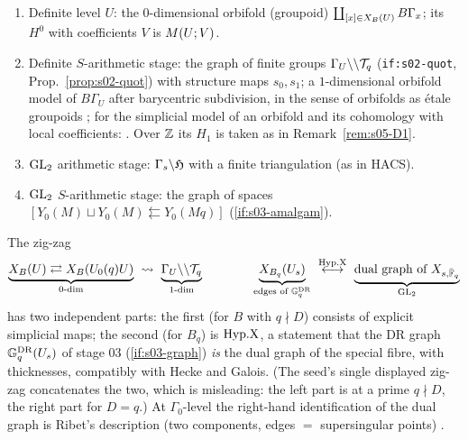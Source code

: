 \begin{definition}\label{def:s05-stages}
\begin{enumerate}[label=(\roman*)]
\item Definite level $U$: the $0$-dimensional orbifold (groupoid) $\coprod_{[x]\in X_B(U)}B\Gamma_x$; its $H^0$ with coefficients $V$ is
  $M(U;V)$.
\item Definite $S$-arithmetic stage: the graph of finite groups $\Gamma_U\backslash\backslash\mathcal{T}_q$ (\texttt{if:s02-quot}, Prop.~\ref{prop:s02-quot}) with
  structure maps $s_0,s_1$; a $1$-dimensional orbifold model of $B\Gamma_U$ after barycentric subdivision, in the sense of orbifolds as
  étale groupoids  ; for the simplicial model of an orbifold and its cohomology with local coefficients:
  . Over $\mathbb{Z}$ its $H_1$ is taken as in
  Remark~\ref{rem:s05-D1}.
\item $\mathrm{GL}_2$ arithmetic stage: $\Gamma_s\backslash\mathfrak{H}$ with a finite triangulation (as in HACS).
\item $\mathrm{GL}_2$ $S$-arithmetic stage: the graph of spaces $[Y_0(M)\sqcup Y_0(M)\leftleftarrows Y_0(Mq)]$ (\ref{if:s03-amalgam}).
\end{enumerate}
\end{definition}
The zig-zag
\[\underbrace{\XB{U}\rightleftarrows\XB{\Uzero{q}U}}_{\text{0-dim}}\ \leadsto\ \underbrace{\Gamma_U\quot\cT_q}_{\text{1-dim}}
\qquad\qquad \underbrace{\XBq{U_s}}_{\text{edges of }\GDR_q}\ \overset{\HypX}{\longleftrightarrow}\ \underbrace{\text{dual graph of }X_{s,\bar\F_q}}_{\GL_2}\]
has two independent parts: the first (for $B$ with $q\nmid D$) consists of explicit simplicial maps; the second (for $B_q$) is $\mathrm{Hyp.X}$,
a statement that the DR graph $\mathbb{G}^{\mathrm{DR}}_q(U_s)$ of stage 03 (\ref{if:s03-graph}) \emph{is} the dual graph of the special fibre, with
thicknesses, compatibly with Hecke and Galois. (The seed's single displayed zig-zag concatenates the two, which is misleading: the
left part is at a prime $q\nmid D$, the right part for $D=q$.) At $\Gamma_0$-level the right-hand identification of the dual graph is
Ribet's description (two components, edges $=$ supersingular points) .


